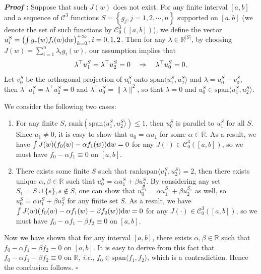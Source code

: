 \documentclass{article}
\def\gC{{\mathcal{C}}}
\newcommand{\R}{\mathbb{R}}
\newcommand{\dd}{\textup{d}}
\renewenvironment{proof}{\noindent\textbf{\textit{Proof }:}}{\hfill$\square$}
\begin{document}
\begin{proof}
    Suppose that such $J(w)$ does not exist.
    For any finite interval $[a,b]$ and a sequence of $\gC^3$ functions $S = \left\{g_j,j=1,2,\cdots,n\right\}$ supported on $[a,b]$ (we denote the set of such functions by $\gC_0^3([a,b])$), we define the vector $u_i^S = \left(\int g_r(w) f_i(w)\dd w\right)_{k=0}^{+\infty}, i=0,1,2$. Then for any $\lambda\in\R^{|S|}$, by choosing $J(w)=\sum_{i=1}^n\lambda_i g_{i}(w)$, our assumption implies that 
    \begin{equation}
        \notag
        \lambda^\top u_1^S = \lambda^\top u_2^S = 0 \quad \Rightarrow \quad \lambda^\top u_0^S = 0.
    \end{equation}
    Let $v_0^S$ be the orthogonal projection of $u_0^S$ onto $\mathrm{span}\langle u_1^S, u_2^S \rangle$ and $\lambda = u_0^S - v_0^S$, then $\lambda^\top u_1^S = \lambda^\top u_2^S = 0$ and $\lambda^\top u_0^S = \|\lambda\|^2$, so that $\lambda=0$ and $u_0^S\in\mathrm{span}\langle u_1^S, u_2^S \rangle$. 
    
    We consider the following two cases:
    \begin{enumerate}[1.]
        \item For any finite $S$, $\mathrm{rank}\left(\mathrm{span}\langle u_1^S, u_2^S \rangle\right) \leq 1$, then $u_0^S$ is parallel to $u_1^S$ for all $S$. Since $u_1\neq 0$, it is easy to show that $u_0=\alpha u_1$ for some $\alpha\in\R$. As a result, we have $\int J(w)(f_0(w)-\alpha f_1(w))\dd w = 0$ for any $J(\cdot)\in\gC_0^3([a,b])$, so we must have $f_0-\alpha f_1\equiv 0$ on $[a,b]$.
        \item There exists some finite $S$ such that $\mathrm{rank}\mathrm{span}\langle u_1^S, u_2^S \rangle = 2$, then there exists unique $\alpha,\beta\in\R$ such that $u_0^S=\alpha u_1^S + \beta u_2^S$. By considering any set $S_1 = S\cup\{s\}, s\notin S$, one can show that $u_0^{S_1}=\alpha u_1^{S_1} + \beta u_2^{S_1}$ as well, so $u_0^S=\alpha u_1^S + \beta u_2^S$ for any finite set $S$. As a result, we have $\int J(w)(f_0(w)-\alpha f_1(w) - \beta f_2(w))\dd w = 0$ for any $J(\cdot)\in\gC_0^3([a,b])$, so we must have $f_0-\alpha f_1 - \beta f_2\equiv 0$ on $[a,b]$.
    \end{enumerate}
    Now we have shown that for any interval $[a,b]$, there exists $\alpha,\beta\in\R$ such that $f_0-\alpha f_1 - \beta f_2\equiv 0$ on $[a,b]$. It is easy to derive from this fact that $f_0-\alpha f_1 - \beta f_2\equiv 0$ on $\R$, \emph{i.e.}, $f_0\in\mathrm{span}\langle f_1,f_2\rangle$, which is a contradiction. Hence the conclusion follows.
\end{proof}


%
\end{document}
